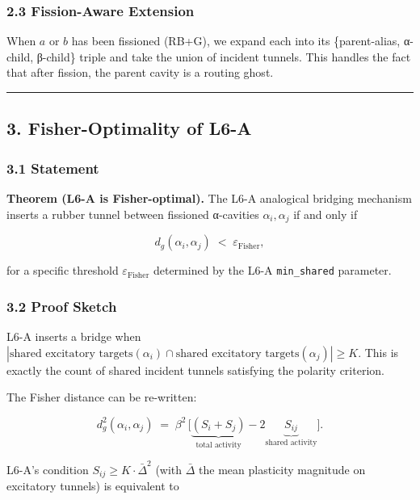 \documentclass[
  11pt,
  a4paper,
]{article}
\begin{document}
\subsubsection{2.3 Fission-Aware
Extension}\label{fission-aware-extension}

When \(a\) or \(b\) has been fissioned (RB+G), we expand each into its
\{parent-alias, α-child, β-child\} triple and take the union of incident
tunnels. This handles the fact that after fission, the parent cavity is
a routing ghost.

\begin{center}\rule{0.5\linewidth}{0.5pt}\end{center}

\subsection{3. Fisher-Optimality of
L6-A}\label{fisher-optimality-of-l6-a}

\subsubsection{3.1 Statement}\label{statement}

\textbf{Theorem (L6-A is Fisher-optimal).} The L6-A analogical bridging
mechanism inserts a rubber tunnel between fissioned α-cavities
\(\alpha_i, \alpha_j\) if and only if

\[
d_g(\alpha_i, \alpha_j) \;<\; \varepsilon_\text{Fisher},
\]

for a specific threshold \(\varepsilon_\text{Fisher}\) determined by the
L6-A \texttt{min\_shared} parameter.

\subsubsection{3.2 Proof Sketch}\label{proof-sketch}

L6-A inserts a bridge when
\(|\text{shared excitatory targets}(\alpha_i) \cap \text{shared excitatory targets}(\alpha_j)| \geq K\).
This is exactly the count of shared incident tunnels satisfying the
polarity criterion.

The Fisher distance can be re-written:

\[
d_g^2(\alpha_i, \alpha_j) \;=\; \beta^2 \, \Big[ \underbrace{(S_i + S_j)}_{\text{total activity}} - 2 \underbrace{S_{ij}}_{\text{shared activity}} \Big].
\]

L6-A's condition \(S_{ij} \geq K \cdot \bar{\Delta}^2\) (with
\(\bar{\Delta}\) the mean plasticity magnitude on excitatory tunnels) is
equivalent to
\end{document}
